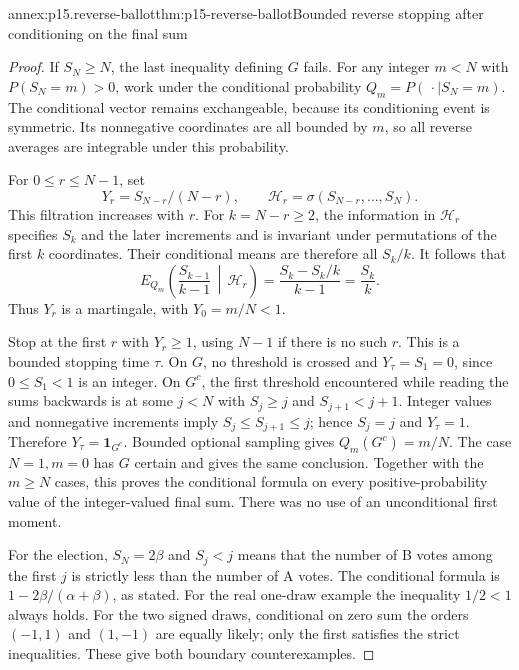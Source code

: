 \begin{annexitem}{annex:p15.reverse-ballot}{thm:p15-reverse-ballot}{Bounded reverse stopping after conditioning on the final sum}
\begin{proof}
If \(S_N\geq N\), the last inequality defining \(G\) fails.
For any integer \(m<N\) with \(P(S_N=m)>0\), work under the
conditional probability \(Q_m=P(\,\cdot\mid S_N=m)\).
The conditional vector remains exchangeable, because its conditioning
event is symmetric. Its nonnegative coordinates are all bounded by \(m\),
so all reverse averages are integrable under this probability.

For \(0\leq r\leq N-1\), set
\[
       Y_r=S_{N-r}/(N-r),\qquad
       \mathcal H_r=\sigma(S_{N-r},\ldots,S_N).
\]
This filtration increases with \(r\).
For \(k=N-r\geq2\), the information in \(\mathcal H_r\)
specifies \(S_k\) and the later increments and is invariant under
permutations of the first \(k\) coordinates.
Their conditional means are therefore all \(S_k/k\).
It follows that
\[
 E_{Q_m}\!\left(\frac{S_{k-1}}{k-1}\,\middle|\,\mathcal H_r\right)
   =\frac{S_k-S_k/k}{k-1}=\frac{S_k}{k}.
\]
Thus \(Y_r\) is a martingale, with \(Y_0=m/N<1\).

Stop at the first \(r\) with \(Y_r\geq1\), using \(N-1\) if
there is no such \(r\). This is a bounded stopping time \(\tau\).
On \(G\), no threshold is crossed and \(Y_\tau=S_1=0\), since
\(0\leq S_1<1\) is an integer.
On \(G^c\), the first threshold encountered while reading the sums
backwards is at some \(j<N\) with \(S_j\geq j\) and
\(S_{j+1}<j+1\). Integer values and nonnegative increments imply
\(S_j\leq S_{j+1}\leq j\); hence \(S_j=j\) and \(Y_\tau=1\).
Therefore \(Y_\tau=\mathbf1_{G^c}\).
Bounded optional sampling gives \(Q_m(G^c)=m/N\).
The case \(N=1,m=0\) has \(G\) certain and gives the same conclusion.
Together with the \(m\geq N\) cases, this proves the conditional formula
on every positive-probability value of the integer-valued final sum.
There was no use of an unconditional first moment.

For the election, \(S_N=2\beta\) and
\(S_j<j\) means that the number of B votes among the first \(j\)
is strictly less than the number of A votes.
The conditional formula is \(1-2\beta/(\alpha+\beta)\), as stated.
For the real one-draw example the inequality \(1/2<1\) always holds.
For the two signed draws, conditional on zero sum the orders
\((-1,1)\) and \((1,-1)\) are equally likely; only the first satisfies
the strict inequalities. These give both boundary counterexamples.
\end{proof}
\end{annexitem}

